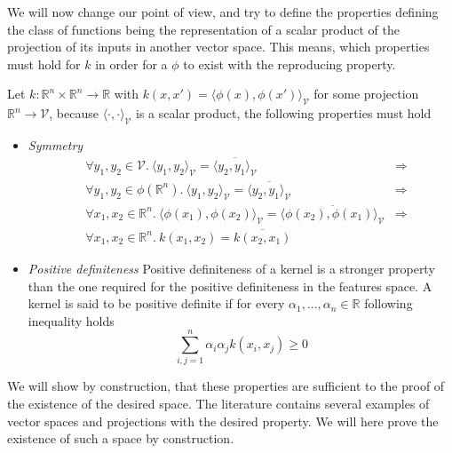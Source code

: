 We will now change our point of view, and try to define the properties defining the class of functions being the representation of a scalar product of the projection of its inputs in another vector space. This means, which properties must hold for $k$ in order for a $\phi$ to exist with the reproducing property.

Let $k :\mathbb{R}^n \times \mathbb{R}^n \rightarrow \mathbb{R}$ with $k(x, x') = \langle \phi(x), \phi(x')\rangle _{\mathcal{V}}$ for some projection $\mathbb{R}^n \rightarrow \mathcal{V}$, because $\langle \cdot, \cdot\rangle _{\mathcal{V}}$ is a scalar product, the following properties must hold

\begin{itemize}
\item \textit{Symmetry}
  \begin{equation*}
    \begin{aligned}
      & \forall y_1, y_2 \in \mathcal{V}.\ 
      \langle y_1, y_2\rangle _{\mathcal{V}} = \overline{\langle y_2, y_1\rangle _{\mathcal{V}}} & \Rightarrow\\
      & \forall y_1, y_2 \in \phi(\mathbb{R}^n).\ 
      \langle y_1, y_2\rangle _{\mathcal{V}} = \overline{\langle y_2, y_1\rangle _{\mathcal{V}}} & \Rightarrow\\
      &\forall x_1, x_2 \in \mathbb{R}^n.\ 
      \langle \phi(x_1), \phi(x_2)\rangle _{\mathcal{V}} = \overline{\langle \phi(x_2), \phi(x_1)\rangle _{\mathcal{V}}} &\Rightarrow\\
      &\forall x_1, x_2 \in \mathbb{R}^n.\ 
         k\left(x_1, x_2\right) = \overline{k\left(x_2, x_1\right)}
    \end{aligned}
  \end{equation*}

\item \textit{Positive definiteness} Positive definiteness of a kernel is a stronger property than the one required for the positive definiteness in the features space. A kernel is said to be positive definite if for every $\alpha_1, ..., \alpha_n \in \mathbb{R}$ following inequality holds
  \begin{equation*}
    \sum_{i,j=1}^n\alpha_i\alpha_jk\left(x_i, x_j\right) \geq 0
  \end{equation*}
\end{itemize}

We will show by construction, that these properties are sufficient to the proof of the existence of the desired space. The literature contains several examples of vector spaces and projections with the desired property. We will here prove the existence of such a space by construction.

